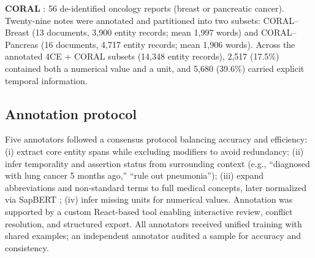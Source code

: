 \textbf{CORAL} \cite{Sushil_2024}: 56 de-identified oncology reports (breast or pancreatic cancer). Twenty-nine notes were annotated and partitioned into two subsets: CORAL--Breast (13 documents, 3{,}900 entity records; mean 1{,}997 words) and CORAL--Pancreas (16 documents, 4{,}717 entity records; mean 1{,}906 words). Across the annotated 4CE + CORAL subsets (14{,}348 entity records), 2{,}517 (17.5\%) contained both a numerical value and a unit, and 5{,}680 (39.6\%) carried explicit temporal information.

\subsection{Annotation protocol}

Five annotators followed a consensus protocol balancing accuracy and efficiency: (i) extract core entity spans while excluding modifiers to avoid redundancy; (ii) infer temporality and assertion status from surrounding context (e.g., ``diagnosed with lung cancer 5 months ago,'' ``rule out pneumonia''); (iii) expand abbreviations and non-standard terms to full medical concepts, later normalized via SapBERT \cite{liu2021self}; (iv) infer missing units for numerical values. Annotation was supported by a custom React-based tool enabling interactive review, conflict resolution, and structured export. All annotators received unified training with shared examples; an independent annotator audited a sample for accuracy and consistency. 


